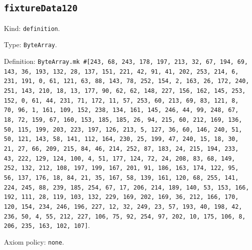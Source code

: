 \documentclass[11pt]{article}
\begin{document}
\subsection*{\texttt{fixtureData120}}
\noindent Kind: \texttt{definition}.\par
\noindent Type: \texttt{ByteArray}.\par
\noindent Definition: \texttt{ByteArray.mk \#[243, 68, 243, 178, 197, 213, 32, 67, 194, 69, 143, 36, 193, 132, 28, 137, 151, 221, 42, 91, 41, 202, 253, 214, 6, 231, 191, 0, 61, 121, 63, 88, 143, 78, 252, 154, 2, 163, 26, 172, 240, 251, 143, 210, 18, 13, 177, 90, 62, 62, 148, 227, 156, 162, 145, 253, 152, 0, 61, 44, 231, 71, 172, 11, 57, 253, 60, 213, 69, 83, 121, 8, 70, 96, 1, 161, 109, 152, 238, 134, 161, 145, 246, 44, 99, 248, 67, 18, 72, 159, 67, 160, 153, 185, 185, 26, 94, 215, 60, 212, 169, 136, 50, 115, 199, 203, 223, 197, 126, 213, 5, 127, 36, 60, 146, 240, 51, 50, 121, 143, 58, 141, 112, 164, 230, 25, 199, 47, 240, 15, 18, 30, 21, 27, 66, 209, 215, 84, 46, 214, 252, 87, 183, 24, 215, 194, 233, 43, 222, 129, 124, 100, 4, 51, 177, 124, 72, 24, 208, 83, 68, 149, 252, 132, 212, 108, 197, 199, 167, 201, 91, 186, 163, 174, 122, 95, 56, 137, 176, 18, 84, 21, 35, 167, 58, 139, 161, 120, 68, 255, 141, 224, 245, 88, 239, 185, 254, 67, 17, 206, 214, 189, 140, 53, 153, 166, 192, 111, 28, 119, 103, 132, 229, 169, 202, 169, 36, 212, 166, 170, 120, 154, 234, 246, 196, 227, 12, 32, 249, 23, 57, 193, 40, 198, 42, 236, 50, 4, 55, 212, 227, 106, 75, 92, 254, 97, 202, 10, 175, 106, 8, 206, 235, 163, 102, 107]}.\par
\noindent Axiom policy: \texttt{none}.\par
\end{document}
